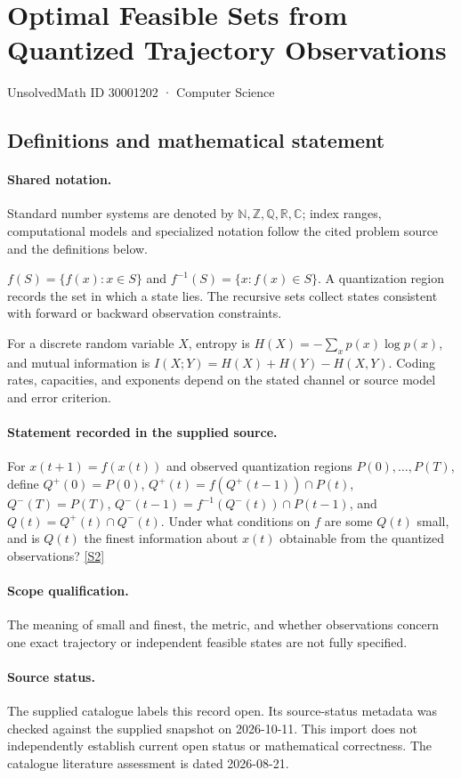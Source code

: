 \documentclass[11pt]{article}
\newcommand{\sref}[2]{\hyperlink{source:#1:#2}{[S#2]}}
\begin{document}
\setcounter{section}{30001201}
\section{Optimal Feasible Sets from Quantized Trajectory Observations}\label{30001202}
{\small\sffamily UnsolvedMath ID 30001202 · Computer Science}
\subsection{Definitions and mathematical statement}

\paragraph{Shared notation.}Standard number systems are denoted by $\mathbb N,\mathbb Z,\mathbb Q,\mathbb R,\mathbb C$; index ranges, computational models and specialized notation follow the cited problem source and the definitions below.


$f(S)=\{f(x):x\in S\}$ and $f^{-1}(S)=\{x:f(x)\in S\}$. A quantization region records the set in which a state lies. The recursive sets collect states consistent with forward or backward observation constraints.

For a discrete random variable $X$, entropy is $H(X)=-\sum_xp(x)\log p(x)$, and mutual information is $I(X;Y)=H(X)+H(Y)-H(X,Y)$. Coding rates, capacities, and exponents depend on the stated channel or source model and error criterion.
\paragraph{Statement recorded in the supplied source.}
For $x(t+1)=f(x(t))$ and observed quantization regions $P(0),\ldots,P(T)$, define $Q^+(0)=P(0)$, $Q^+(t)=f(Q^+(t-1))\cap P(t)$, $Q^-(T)=P(T)$, $Q^-(t-1)=f^{-1}(Q^-(t))\cap P(t-1)$, and $Q(t)=Q^+(t)\cap Q^-(t)$. Under what conditions on $f$ are some $Q(t)$ small, and is $Q(t)$ the finest information about $x(t)$ obtainable from the quantized observations? \sref{30001202}{2}
\paragraph{Scope qualification.}
The meaning of small and finest, the metric, and whether observations concern one exact trajectory or independent feasible states are not fully specified.
\paragraph{Source status.}
The supplied catalogue labels this record open. Its source-status metadata was checked against the supplied snapshot on 2026-10-11. This import does not independently establish current open status or mathematical correctness. The catalogue literature assessment is dated 2026-08-21.
\end{document}

